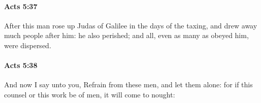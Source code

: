 		\paragraph{Acts 5:37} %
			\label{ACTS-5-37}

			After this man rose up Judas of Galilee in the days of the taxing, and drew away much people after him: he also perished; and all, even as many as obeyed him, were dispersed.

			\begin{framed}
			\scriptsize
				\begin{compactdesc}
					\item[SBLG] 
				\end{compactdesc}
			\end{framed}

		\paragraph{Acts 5:38} %
			\label{ACTS-5-38}

			And now I say unto you, Refrain from these men, and let them alone: for if this counsel or this work be of men, it will come to nought:

